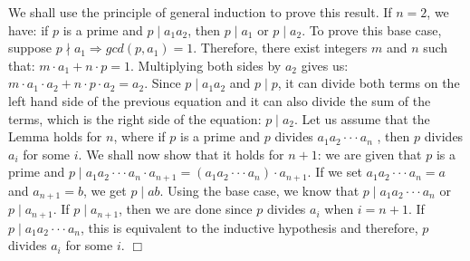 \documentclass[12pt,letterpaper,reqno]{amsart}
\begin{document}
\begin{enumerate}
\begin{flushleft}
We shall use the principle of general induction to prove this result. If $n = 2$, we have: if $p$ is a prime and $p \mid a_1 a_2$, then $p \mid a_1$ or $p \mid a_2$. To prove this base case, suppose $p \nmid a_1 \Rightarrow gcd(p,a_1) = 1$. Therefore, there exist integers $m$ and $n$ such that: $m\cdot a_1 + n\cdot p = 1$. Multiplying both sides by $a_2$ gives us: $m\cdot a_1\cdot a_2 + n\cdot p\cdot a_2 = a_2$. Since $p \mid a_1a_2$ and $p \mid p$, it can divide both terms on the left hand side of the previous equation and it can also divide the sum of the terms, which is the right side of the equation: $p \mid a_2$. Let us assume that the Lemma holds for $n$, where if $p$ is a prime and $p$ divides $a_1 a_2 \cdot\cdot\cdot a_n$ , then $p$ divides $a_i$ for some $i$. We shall now show that it holds for $n+1$: we are given that $p$ is a prime and $p \mid a_1 a_2 \cdot\cdot\cdot a_n \cdot a_{n+1} = (a_1 a_2 \cdot\cdot\cdot a_{n}) \cdot a_{n+1}$. If we set $a_1 a_2 \cdot\cdot\cdot a_{n} = a$ and $a_{n+1} = b$, we get $p \mid ab$. Using the base case, we know that $p \mid a_1 a_2 \cdot\cdot\cdot a_n$ or $p \mid a_{n+1}$. If $p \mid a_{n+1}$, then we are done since $p$ divides $a_i$ when $i = n+1$. If $p \mid a_1 a_2 \cdot\cdot\cdot a_n$, this is equivalent to the inductive hypothesis and therefore, $p$ divides $a_i$ for some $i$. $\Box$
\end{flushleft}

\end{enumerate}
\end{document}

